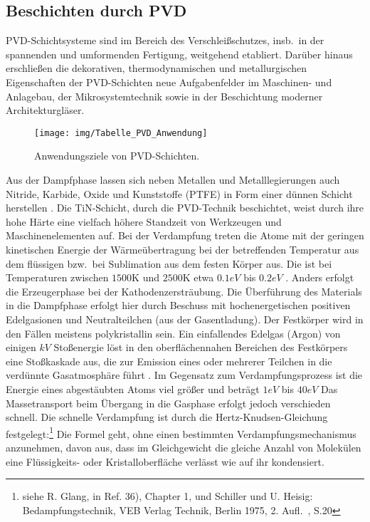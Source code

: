 \documentclass[12pt,a4paper,bibliography=totocnumbered,listof=totocnumbered,fleqn]{scrartcl}
\begin{document}
\subsection{Beschichten durch PVD}

PVD-Schichtsysteme sind im Bereich des Verschleißschutzes, insb.\ in der spannenden und umformenden Fertigung, weitgehend etabliert.
Darüber hinaus erschließen die dekorativen, thermodynamischen und metallurgischen Eigenschaften der PVD-Schichten neue Aufgabenfelder im Maschinen- und Anlagebau, der Mikrosystemtechnik sowie in der Beschichtung moderner Architekturgläser.

\begin{figure}[h!]
\centering
\texttt{[image: img/Tabelle\_PVD\_Anwendung]}
\caption{Anwendungsziele von PVD-Schichten.}
\label{fig:tabelle Anwendung}
\end{figure}

Aus der Dampfphase lassen sich neben Metallen und Metalllegierungen auch Nitride, Karbide, Oxide und Kunststoffe (PTFE) in Form einer dünnen Schicht herstellen \citep{hofmann2013werkstoffe}.
Die TiN-Schicht, durch die PVD-Technik beschichtet, weist durch ihre hohe Härte eine vielfach höhere Standzeit von Werkzeugen und Maschinenelementen auf.
Bei der Verdampfung treten die Atome mit der geringen kinetischen Energie der Wärmeübertragung bei der betreffenden Temperatur aus dem flüssigen bzw.\ bei Sublimation aus dem festen Körper aus.
Die ist bei Temperaturen zwischen $1500$K und $2500$K etwa $0.1eV$ bis $0.2eV$ \citep{pulker1985verschleissschutzschichten}.
Anders erfolgt die Erzeugerphase bei der Kathodenzersträubung.
Die Überführung des Materials in die Dampfphase erfolgt hier durch Beschuss mit hochenergetischen positiven Edelgasionen und Neutralteilchen (aus der Gasentladung).
Der Festkörper wird in den Fällen meistens polykristallin sein.
Ein einfallendes Edelgas (Argon) von einigen $kV$ Stoßenergie löst in den oberflächennahen Bereichen des Festkörpers eine Stoßkaskade aus, die zur Emission eines oder mehrerer Teilchen in die verdünnte Gasatmosphäre führt \citep{pulker1985verschleissschutzschichten}.
Im Gegensatz zum Verdampfungsprozess ist die Energie eines abgestäubten Atoms viel größer und beträgt $1eV$ bis $40eV$
Das Massetransport beim Übergang in die Gasphase erfolgt jedoch verschieden schnell.
Die schnelle Verdampfung ist durch die Hertz-Knudsen-Gleichung festgelegt:\footnote{siehe R. Glang, in Ref. 36), Chapter 1, und Schiller und U. Heisig: Bedampfungstechnik, VEB Verlag Technik, Berlin 1975, 2. Aufl.\ , S.20}
Die Formel geht, ohne einen bestimmten Verdampfungsmechanismus anzunehmen, davon aus, dass im Gleichgewicht die gleiche Anzahl von Molekülen eine Flüssigkeits- oder Kristalloberfläche verlässt wie auf ihr kondensiert.
\end{document}
